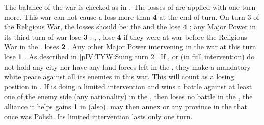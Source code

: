 \phpaix
\aparag The balance of the war is checked as in .  The losses of \STAB are applied with one turn more. This war can not
cause a loss more than {\bf 4} \STAB at the end of turn.  On turn 3 of the
Religious War, the losses should be:
\bparag the \alliance and the \ligue lose {\bf 4} \STAB;
\bparag any Major Power in its third turn of war lose {\bf 3} \STAB.
\bparag \SPA, \HOL, \AUS lose {\bf 4} \STAB if they were at war before the
Religious War in the \HRE.
\bparag \SUE loses {\bf 2} \STAB.
\bparag Any other Major Power intervening in the war at this turn lose {\bf 1}
\STAB.
 As described in \ref{pIV:TYW:Suing turn 2}.
\aparag If \SUE, \ENG or \POL (in full intervention) do not hold any city nor
have any land forces left in the \HRE, they make a mandatory white peace
against all its enemies in this war. This will count as a losing position in
.
\aparag If \POL is doing a limited intervention and wins a battle against at
least one \ARMY\faceplus of the enemy side (any nationality) in the \HRE, then
loses no battle in the \HRE, the alliance it helps gains {\bf 1} in \STAB
(\AUS also). \POL may then annex  or any province in the
\HRE that once was Polish. Its limited intervention lasts only one turn.

